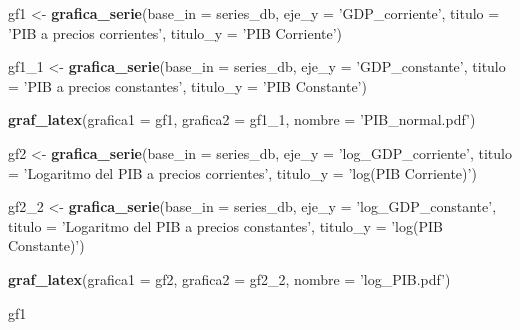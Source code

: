 \documentclass[]{book}
\newenvironment{Shaded}{\begin{snugshade}}{\end{snugshade}}
\newcommand{\KeywordTok}[1]{\textcolor[rgb]{0.13,0.29,0.53}{\textbf{#1}}}
\newcommand{\DataTypeTok}[1]{\textcolor[rgb]{0.13,0.29,0.53}{#1}}
\newcommand{\DecValTok}[1]{\textcolor[rgb]{0.00,0.00,0.81}{#1}}
\newcommand{\StringTok}[1]{\textcolor[rgb]{0.31,0.60,0.02}{#1}}
\newcommand{\NormalTok}[1]{#1}
\theoremstyle{definition}
\theoremstyle{definition}
\theoremstyle{definition}
\theoremstyle{remark}
\begin{document}
\begin{Shaded}
\begin{Highlighting}[]
\NormalTok{gf1 <-}\StringTok{ }\KeywordTok{grafica_serie}\NormalTok{(}\DataTypeTok{base_in =}\NormalTok{ series_db, }
                      \DataTypeTok{eje_y =} \StringTok{'GDP_corriente'}\NormalTok{, }
                      \DataTypeTok{titulo =} \StringTok{'PIB a precios corrientes'}\NormalTok{, }
                      \DataTypeTok{titulo_y =} \StringTok{'PIB Corriente'}\NormalTok{)}

\NormalTok{gf1_}\DecValTok{1}\NormalTok{ <-}\StringTok{ }\KeywordTok{grafica_serie}\NormalTok{(}\DataTypeTok{base_in =}\NormalTok{ series_db, }
                      \DataTypeTok{eje_y =} \StringTok{'GDP_constante'}\NormalTok{, }
                      \DataTypeTok{titulo =} \StringTok{'PIB a precios constantes'}\NormalTok{, }
                      \DataTypeTok{titulo_y =} \StringTok{'PIB Constante'}\NormalTok{)}

\KeywordTok{graf_latex}\NormalTok{(}\DataTypeTok{grafica1 =}\NormalTok{ gf1,}
          \DataTypeTok{grafica2 =}\NormalTok{ gf1_}\DecValTok{1}\NormalTok{,}
          \DataTypeTok{nombre =} \StringTok{'PIB_normal.pdf'}\NormalTok{)}

\NormalTok{gf2 <-}\StringTok{ }\KeywordTok{grafica_serie}\NormalTok{(}\DataTypeTok{base_in =}\NormalTok{ series_db, }
                      \DataTypeTok{eje_y =} \StringTok{'log_GDP_corriente'}\NormalTok{, }
                      \DataTypeTok{titulo =} \StringTok{'Logaritmo del PIB a precios corrientes'}\NormalTok{, }
                      \DataTypeTok{titulo_y =} \StringTok{'log(PIB Corriente)'}\NormalTok{)}

\NormalTok{gf2_}\DecValTok{2}\NormalTok{ <-}\StringTok{ }\KeywordTok{grafica_serie}\NormalTok{(}\DataTypeTok{base_in =}\NormalTok{ series_db, }
                      \DataTypeTok{eje_y =} \StringTok{'log_GDP_constante'}\NormalTok{, }
                      \DataTypeTok{titulo =} \StringTok{'Logaritmo del PIB a precios constantes'}\NormalTok{, }
                      \DataTypeTok{titulo_y =} \StringTok{'log(PIB Constante)'}\NormalTok{)}


\KeywordTok{graf_latex}\NormalTok{(}\DataTypeTok{grafica1 =}\NormalTok{ gf2,}
          \DataTypeTok{grafica2 =}\NormalTok{ gf2_}\DecValTok{2}\NormalTok{,}
          \DataTypeTok{nombre =} \StringTok{'log_PIB.pdf'}\NormalTok{)}
\end{Highlighting}
\end{Shaded}

\begin{Shaded}
\begin{Highlighting}[]
\NormalTok{gf1}
\end{Highlighting}
\end{Shaded}
\end{document}
